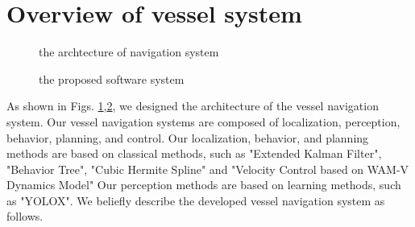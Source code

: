 \documentclass[lettersize,journal]{IEEEtran}
\begin{document}
\section{Overview of vessel system}
\begin{figure}[htbp]
  \begin{center}
  \end{center}
  \caption{the archtecture of navigation system}
  \label{fig:arch_nav}
\end{figure}
\begin{figure}[htbp]
  \begin{center}
  \end{center}
  \caption{the proposed software system}
  \label{fig:pss}
\end{figure}

As shown in  Figs. \ref{fig:arch_nav},\ref{fig:pss},
we designed the architecture of the vessel navigation system. 
Our vessel navigation systems are composed of localization, perception, behavior, planning, and control.
Our localization, behavior, and planning methods are based on classical methods, such as "Extended Kalman Filter", "Behavior Tree", "Cubic Hermite Spline" and "Velocity Control based on WAM-V Dynamics Model"
Our perception methods are based on learning methods, such as "YOLOX".
We beliefly describe the developed vessel navigation system as follows.
\end{document}

